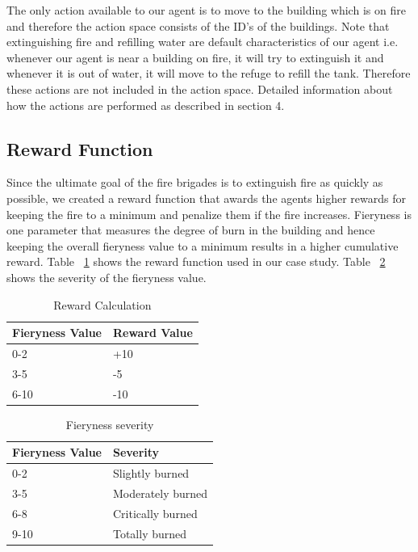 \documentclass[12pt]{report}
\begin{document}
The only action available to our agent is to move to the building which is on fire and therefore the action space consists of the ID's of the buildings. Note that extinguishing fire and refilling water are default characteristics of our agent i.e. whenever our agent is near a building on fire, it will try to extinguish it and whenever it is out of water, it will move to the refuge to refill the tank. Therefore these actions are not included in the action space. Detailed information about how the actions are performed as described in section 4.
    
\subsection{Reward Function}
        
Since the ultimate goal of the fire brigades is to extinguish fire as quickly as possible, we created a reward function that awards the agents higher rewards for keeping the fire to a minimum and penalize them if the fire increases. Fieryness is one parameter that measures the degree of burn in the building and hence keeping the overall fieryness value to a minimum results in a higher cumulative reward. Table ~\ref{table:RewardsTable} shows the reward function used in our case study. Table ~\ref{table:FierynessSeverity} shows the severity of the fieryness value. 
     
\begin{table} [!h]
\begin{center}
 \begin{tabular}{l | l} 
 \hline
 Fieryness Value & Reward Value  \\ [0.5ex] 
 \hline\hline
 0-2 & +10 \\
 3-5 & -5\\
 6-10 & -10  \\ 
 \hline
\end{tabular}
\caption{Reward Calculation}
\label{table:RewardsTable}
\end{center}
\end{table}
 
 
\begin{table} [!h]
\begin{center}
 \begin{tabular}{l | l} 
 \hline
 Fieryness Value & Severity  \\ [0.5ex] 
 \hline\hline
 0-2 & Slightly burned \\
 3-5 & Moderately burned\\
 6-8 & Critically burned\\ 
 9-10 & Totally burned\\
 \hline
\end{tabular}
\caption{Fieryness severity}
\label{table:FierynessSeverity}
\end{center}
\end{table}
\end{document}
